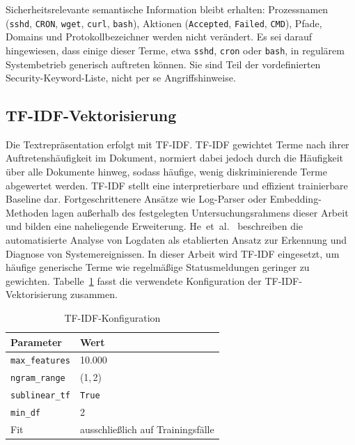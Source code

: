 Sicherheitsrelevante semantische Information bleibt erhalten: Prozessnamen (\texttt{sshd}, \texttt{CRON}, \texttt{wget}, \texttt{curl}, \texttt{bash}), Aktionen (\texttt{Accepted}, \texttt{Failed}, \texttt{CMD}), Pfade, Domains und Protokollbezeichner werden nicht verändert. Es sei darauf hingewiesen, dass einige dieser Terme, etwa \texttt{sshd}, \texttt{cron} oder \texttt{bash}, in regulärem Systembetrieb generisch auftreten können. Sie sind Teil der vordefinierten Security-Keyword-Liste, nicht per se Angriffshinweise.

\subsection{TF-IDF-Vektorisierung}

Die Textrepräsentation erfolgt mit TF-IDF. TF-IDF gewichtet Terme nach ihrer Auftretenshäufigkeit im Dokument, normiert dabei jedoch durch die Häufigkeit über alle Dokumente hinweg, sodass häufige, wenig diskriminierende Terme abgewertet werden. TF-IDF stellt eine interpretierbare und effizient trainierbare Baseline dar. Fortgeschrittenere Ansätze wie Log-Parser oder Embedding-Methoden lagen außerhalb des festgelegten Untersuchungsrahmens dieser Arbeit und bilden eine naheliegende Erweiterung. He~et~al.~\cite{he2021survey} beschreiben die automatisierte Analyse von Logdaten als etablierten Ansatz zur Erkennung und Diagnose von Systemereignissen. In dieser Arbeit wird TF-IDF eingesetzt, um häufige generische Terme wie regelmäßige Statusmeldungen geringer zu gewichten. Tabelle~\ref{tab:tfidf_params} fasst die verwendete Konfiguration der TF-IDF-Vektorisierung zusammen.

\begingroup
\renewcommand{\arraystretch}{1.20}
\setlength{\tabcolsep}{10pt}
\begin{table}[H]
  \centering
  \caption{TF-IDF-Konfiguration}
  \label{tab:tfidf_params}
  \begin{tabular}{ll}
    \hline
    \textbf{Parameter} & \textbf{Wert} \\
    \hline
    \texttt{max\_features}  & 10.000 \\
    \texttt{ngram\_range}   & (1,\,2) \\
    \texttt{sublinear\_tf}  & \texttt{True} \\
    \texttt{min\_df}        & 2 \\
    Fit                     & ausschließlich auf Trainingsfälle \\
    \hline
  \end{tabular}
\end{table}
\endgroup

